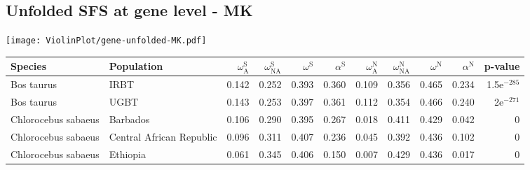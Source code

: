 \subsection{Unfolded SFS at gene level - MK} 
\begin{center}
\texttt{[image: ViolinPlot/gene-unfolded-MK.pdf]} 
\begin{adjustbox}{width = 1\textwidth}
\begin{tabular}{llrrrrrrrrr}
\toprule
             Species &                Population & $\omega_{\textrm{A}}^{\textrm{S}}$ & $\omega_{\textrm{NA}}^{\textrm{S}}$ & $\omega^{\textrm{S}}$ & $\alpha^{\textrm{S}}$ & $\omega_{\textrm{A}}^{\textrm{N}}$ & $\omega_{\textrm{NA}}^{\textrm{N}}$ & $\omega^{\textrm{N}}$ & $\alpha^{\textrm{N}}$ &       p-value \\
\midrule
          Bos taurus &                      IRBT &                              0.142 &                               0.252 &                 0.393 &                 0.360 &                              0.109 &                               0.356 &                 0.465 &                 0.234 & 1.5e$^{-285}$ \\
          Bos taurus &                      UGBT &                              0.143 &                               0.253 &                 0.397 &                 0.361 &                              0.112 &                               0.354 &                 0.466 &                 0.240 &   2e$^{-271}$ \\
 Chlorocebus sabaeus &                  Barbados &                              0.106 &                               0.290 &                 0.395 &                 0.267 &                              0.018 &                               0.411 &                 0.429 &                 0.042 &             0 \\
 Chlorocebus sabaeus &  Central African Republic &                              0.096 &                               0.311 &                 0.407 &                 0.236 &                              0.045 &                               0.392 &                 0.436 &                 0.102 &             0 \\
 Chlorocebus sabaeus &                  Ethiopia &                              0.061 &                               0.345 &                 0.406 &                 0.150 &                              0.007 &                               0.429 &                 0.436 &                 0.017 &             0 \\

\end{tabular}
\end{adjustbox}
\end{center}
